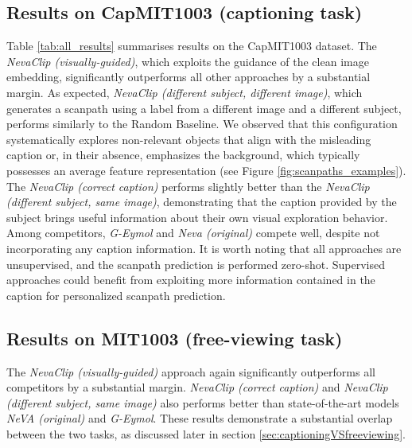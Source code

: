 \documentclass{article}
\begin{document}
\subsection{Results on CapMIT1003 (captioning task)}

Table \ref{tab:all_results} summarises results on the CapMIT1003 dataset. The \textit{NevaClip (visually-guided)}, which exploits the guidance of the clean image embedding, significantly outperforms all other approaches by a substantial margin. As expected, \textit{NevaClip (different subject, different image)}, which generates a scanpath using a label from a different image and a different subject, performs similarly to the Random Baseline. We observed that this configuration systematically explores non-relevant objects that align with the misleading caption or, in their absence, emphasizes the background, which typically possesses an average feature representation (see Figure \ref{fig:scanpaths_examples}). The \textit{NevaClip (correct caption)}  performs slightly better than the \textit{NevaClip (different subject, same image)}, demonstrating that the caption provided by the subject brings useful information about their own visual exploration behavior. Among competitors, \textit{G-Eymol} and \textit{Neva (original)} compete well, despite not incorporating any caption information. It is worth noting that all approaches are unsupervised, and the scanpath prediction is performed  zero-shot. Supervised approaches could benefit from exploiting more information contained in the caption for personalized scanpath prediction. 




\subsection{Results on MIT1003 (free-viewing task)}

The \textit{NevaClip (visually-guided)} approach again significantly outperforms all competitors by a substantial margin. \textit{NevaClip (correct caption)} and \textit{NevaClip (different subject, same image)} also performs better than state-of-the-art models \textit{NeVA (original)} and \textit{G-Eymol}. These results demonstrate a substantial overlap between the two tasks, as discussed later in section \ref{sec:captioningVSfreeviewing}. 
\end{document}

